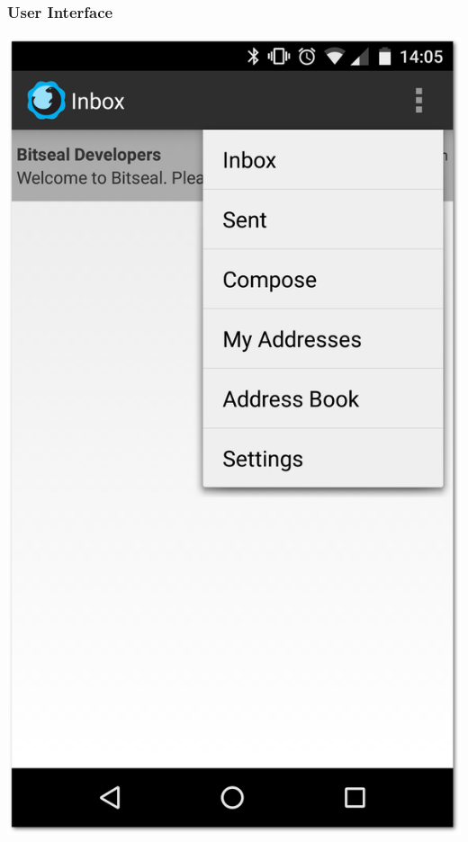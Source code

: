 \documentclass{bfh}
\begin{document}
  \subsubsection{User Interface}
  \begin{center}
    \begin{minipage}{.3\linewidth}
      \includegraphics[width=1.0 \textwidth]{images/screenshots/bitseal_inbox.png}
    \end{minipage}
    \hspace{.03\linewidth}

\end{center}
\end{document}
